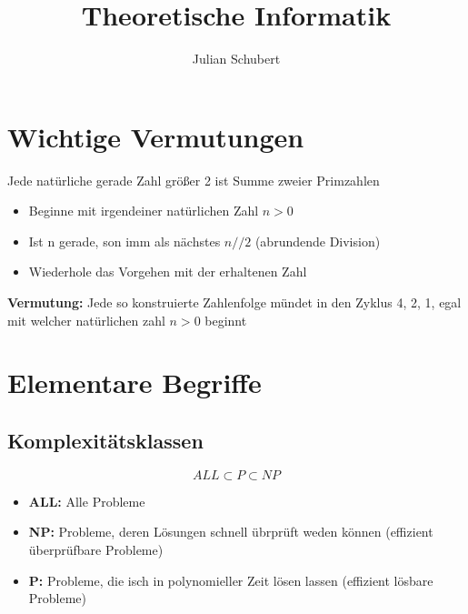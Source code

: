 \documentclass[14pt]{article}
\title{Theoretische Informatik}
\author{Julian Schubert}
\begin{document}
    \maketitle
    \tableofcontents

    \newpage

    \section{Wichtige Vermutungen}
    \begin{definition}
        Jede natürliche gerade Zahl größer 2 ist Summe zweier Primzahlen
    \end{definition}
    \begin{definition}
        \begin{itemize}
            \item Beginne mit irgendeiner natürlichen Zahl $n > 0$
            \item Ist n gerade, son imm als nächstes $n // 2$ (abrundende Division)
            \item Wiederhole das Vorgehen mit der erhaltenen Zahl
        \end{itemize}
        \noindent
        \textbf{Vermutung:} Jede so konstruierte Zahlenfolge mündet in den Zyklus
            4, 2, 1, egal mit welcher natürlichen zahl $n > 0$ beginnt
    \end{definition}
    
    \section{Elementare Begriffe}

        \subsection{Komplexitätsklassen}
        \[
            ALL \subset P \subset NP
        \]
        \begin{itemize}
            \item \textbf{ALL:} Alle Probleme
            \item \textbf{NP:} Probleme, deren Lösungen schnell übrprüft weden können
                (effizient überprüfbare Probleme)
            \item \textbf{P:} Probleme, die isch in polynomieller Zeit lösen lassen 
                (effizient lösbare Probleme)
        \end{itemize}
\end{document}

